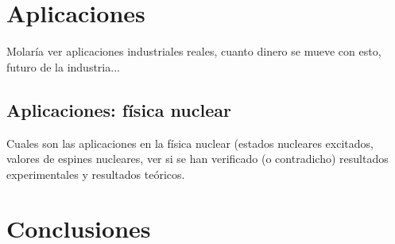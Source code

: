 \documentclass[fleqn,10pt]{SelfArx} %
\begin{document}
\section{Aplicaciones}

Molaría ver aplicaciones industriales reales, cuanto dinero se mueve con esto, futuro de la industria...

\subsection{Aplicaciones: física nuclear}

Cuales son las aplicaciones en la física nuclear (estados nucleares excitados, valores de espines nucleares, ver si se han verificado (o contradicho) resultados experimentales y resultados teóricos. 


\section{Conclusiones}










\newpage
{}



\end{document}
